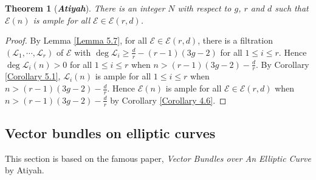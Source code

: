 \documentclass{ctexart}
\newtheorem{theorem}{Theorem}[section]
\begin{document}
\begin{theorem}[\textbf{\emph{Atiyah}}]
    There is an integer $N$ with respect to $g$, $r$ and $d$ such that $\mathcal{E}(n)$ is ample for all $\mathcal{E}\in \mathcal{E}(r, d)$.
    \label{Theorem 5.1}
\end{theorem}
\begin{proof}
    By Lemma \ref{Lemma 5.7}, for all $\mathcal{E}\in \mathcal{E}(r, d)$, there is a filtration $(\mathcal{L}_{1}, \cdots, \mathcal{L}_{r})$ of $\mathcal{E}$ with $\deg \mathcal{L}_{i} \ge \frac{d}{r} - (r - 1)(3g - 2)$ for all $1 \le i \le r$.
    Hence $\deg \mathcal{L}_{i}(n) > 0$ for all $1 \le i \le r$ when $n > (r - 1)(3g - 2) - \frac{d}{r}$.
    By Corollary \ref{Corollary 5.1}, $\mathcal{L}_{i}(n)$ is ample for all $1 \le i \le r$ when $n > (r - 1)(3g - 2) - \frac{d}{r}$.
    Hence $\mathcal{E}(n)$ is ample for all $\mathcal{E}\in \mathcal{E}(r, d)$ when $n > (r - 1)(3g - 2) - \frac{d}{r}$ by Corollary \ref{Corollary 4.6}.
\end{proof}

\subsection{Vector bundles on elliptic curves}
\label{subsection:Vector_Bundles_on_Curves_Vector_bundles_on_elliptic_curves}

This section is based on the famous paper, \emph{Vector Bundles over An Elliptic Curve} by Atiyah.
\end{document}
